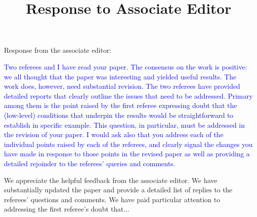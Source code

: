 \documentclass[]{article}
\title{Response to Associate Editor}
\newcommand{\overall}[1]{\textcolor{blue}{#1}}
\begin{document}
	
	\maketitle
	
	
	Response from the associate editor:
	
	\overall{
		Two referees and I have read your paper. The consensus on the work is positive: we all thought that the paper was interesting and yielded useful results. The work does, however, need substantial revision. The two referees have provided detailed reports that clearly outline the issues that need to be addressed. Primary among them is the point raised by the first referee expressing doubt that the (low-level) conditions that underpin the results would be straightforward to establish in specific example. This question, in particular, must be addressed in the revision of your paper. I would ask also that you address each of the individual points raised by each of the referees, and clearly signal the changes you have made in response to those points in the revised paper as well as providing a detailed rejoinder to the referees' queries and comments.
	}

	We appreciate the helpful feedback from the associate editor.
	We have substantially updated the paper and provide a detailed list of replies to the referees' questions and comments.
	We have paid particular attention to addressing the first referee's doubt that...
	
\end{document}

